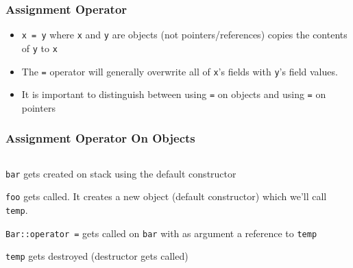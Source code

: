 \begin{frame}
  \frametitle{Assignment Operator}
  \begin{itemize}
    \item {\tt x = y} where {\tt x} and {\tt y} are objects (not pointers/references)
          copies the contents of {\tt y} to {\tt x}
    \item The {\tt =} operator will generally overwrite all of {\tt x}'s fields with {\tt y}'s field values.
    \item It is important to distinguish between using {\tt =} on objects and using {\tt =} on pointers
  \end{itemize}
\end{frame}

\begin{frame}
  \frametitle{Assignment Operator On Objects}
  \begin{center}
    \begin{columns}
      \column{5cm}
      \column{4cm}
    \end{columns}
  \end{center}
  \vskip2mm
  \begin{overprint}
    \begin{center}
      {\tt bar} gets created on stack using the default constructor
    \end{center}

    \begin{center}
      {\tt foo} gets called. It creates a new object (default constructor) which we'll call {\tt temp}.
    \end{center}

    \begin{center}
      {\tt Bar::operator =} gets called on {\tt bar} with as argument a reference to {\tt temp}
    \end{center}

    \begin{center}
      {\tt temp} gets destroyed (destructor gets called)
    \end{center}
  \end{overprint}
\end{frame}

